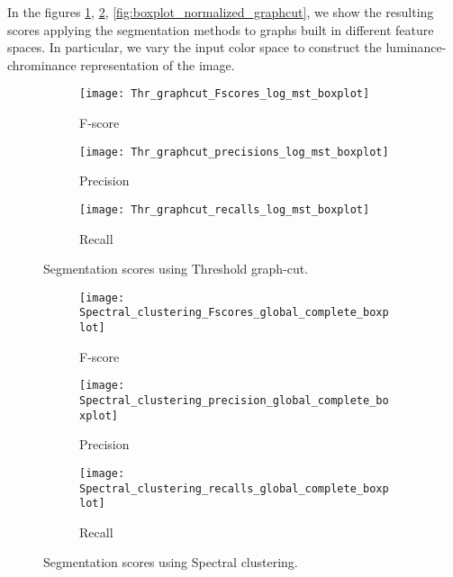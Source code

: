 In the figures \ref{fig:boxplot_threshold_graphcut}, \ref{fig:boxplot_spectral_clustering}, \ref{fig:boxplot_normalized_graphcut}, we show the resulting scores applying the segmentation methods to graphs built in different feature spaces. In particular, we vary the input color space to construct the luminance-chrominance representation of the image.

\begin{figure}[!ht]
    \centering
    \begin{subfigure}[b]{0.3\textwidth}
        \texttt{[image: Thr\_graphcut\_Fscores\_log\_mst\_boxplot]}
        \caption{F-score}
    \end{subfigure}     
    \begin{subfigure}[b]{0.3\textwidth}
    	\centering
    	\texttt{[image: Thr\_graphcut\_precisions\_log\_mst\_boxplot]}
        \caption{Precision}
    \end{subfigure}     
    \begin{subfigure}[b]{0.3\textwidth}
    	\centering
        \texttt{[image: Thr\_graphcut\_recalls\_log\_mst\_boxplot]}
        \caption{Recall}
    \end{subfigure} 
        	    
    \caption{Segmentation scores using Threshold graph-cut.}\label{fig:boxplot_threshold_graphcut}    
\end{figure}

\begin{figure}[!ht]
    \centering
    \begin{subfigure}[b]{0.3\textwidth}
        \texttt{[image: Spectral\_clustering\_Fscores\_global\_complete\_boxplot]}
        \caption{F-score}
    \end{subfigure}     
    \begin{subfigure}[b]{0.3\textwidth}
    	\centering
    	\texttt{[image: Spectral\_clustering\_precision\_global\_complete\_boxplot]}
        \caption{Precision}
    \end{subfigure}     
    \begin{subfigure}[b]{0.3\textwidth}
    	\centering
        \texttt{[image: Spectral\_clustering\_recalls\_global\_complete\_boxplot]}
        \caption{Recall}
    \end{subfigure} 
        	    
    \caption{Segmentation scores using Spectral clustering.}\label{fig:boxplot_spectral_clustering}    
\end{figure}

